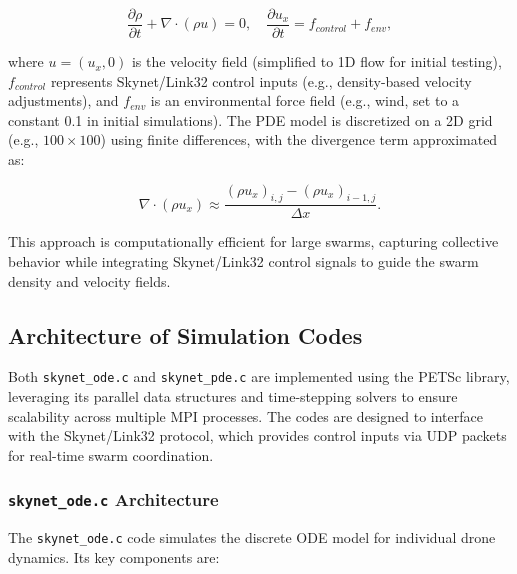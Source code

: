 \documentclass{article}
\theoremstyle{plain}
\begin{document}
$$
  \frac{\partial \rho}{\partial t} + \nabla \cdot (\rho u) = 0,
  \quad \frac{\partial u_x}{\partial t} = f_{control} + f_{env},
$$

where $u = (u_x, 0)$ is the velocity field (simplified to 1D flow for initial testing),
$f_{control}$ represents Skynet/Link32 control inputs (e.g., density-based velocity adjustments),
and $f_{env}$ is an environmental force field (e.g., wind, set to a constant 0.1 in initial simulations).
The PDE model is discretized on a 2D grid (e.g., $100 \times 100$) using finite differences,
with the divergence term approximated as:

$$
  \nabla \cdot (\rho u_x) \approx \frac{(\rho u_x)_{i,j} - (\rho u_x)_{i-1,j}}{\Delta x}.
$$

This approach is computationally efficient for large swarms,
capturing collective behavior while integrating Skynet/Link32
control signals to guide the swarm density and velocity fields.

\subsection{Architecture of Simulation Codes}

Both \texttt{skynet\_ode.c} and \texttt{skynet\_pde.c} are implemented using the PETSc library, leveraging its parallel data structures and time-stepping solvers to ensure scalability across multiple MPI processes. The codes are designed to interface with the Skynet/Link32 protocol, which provides control inputs via UDP packets for real-time swarm coordination.

\subsubsection{\texttt{skynet\_ode.c} Architecture}
The \texttt{skynet\_ode.c} code simulates the discrete ODE model for individual drone dynamics. Its key components are:
\end{document}
